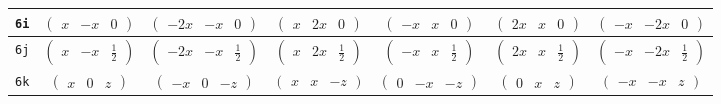\documentclass[fleqn,9pt,landscape]{jsarticle}
\begin{document}
\begin{center}
\begin{longtable}{ccccccc}
{\tt 6i} & $ \begin{pmatrix} x & - x & 0 \end{pmatrix} $ & $ \begin{pmatrix} - 2 x & - x & 0 \end{pmatrix} $ & $ \begin{pmatrix} x & 2 x & 0 \end{pmatrix} $ & $ \begin{pmatrix} - x & x & 0 \end{pmatrix} $ & $ \begin{pmatrix} 2 x & x & 0 \end{pmatrix} $ & $ \begin{pmatrix} - x & - 2 x & 0 \end{pmatrix} $ \\ \hline
{\tt 6j} & $ \begin{pmatrix} x & - x & \frac{1}{2} \end{pmatrix} $ & $ \begin{pmatrix} - 2 x & - x & \frac{1}{2} \end{pmatrix} $ & $ \begin{pmatrix} x & 2 x & \frac{1}{2} \end{pmatrix} $ & $ \begin{pmatrix} - x & x & \frac{1}{2} \end{pmatrix} $ & $ \begin{pmatrix} 2 x & x & \frac{1}{2} \end{pmatrix} $ & $ \begin{pmatrix} - x & - 2 x & \frac{1}{2} \end{pmatrix} $ \\ \hline
{\tt 6k} & $ \begin{pmatrix} x & 0 & z \end{pmatrix} $ & $ \begin{pmatrix} - x & 0 & - z \end{pmatrix} $ & $ \begin{pmatrix} x & x & - z \end{pmatrix} $ & $ \begin{pmatrix} 0 & - x & - z \end{pmatrix} $ & $ \begin{pmatrix} 0 & x & z \end{pmatrix} $ & $ \begin{pmatrix} - x & - x & z \end{pmatrix} $ \\ \hline

\end{longtable}
\end{center}
\end{document}
